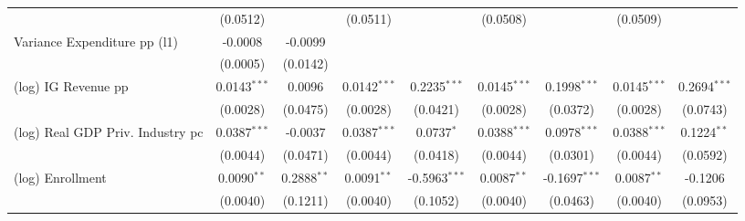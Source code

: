 \documentclass[
  10pt,
]{article}
\begin{document}
\begin{table}[htbp]
\begin{adjustbox}{max width=\linewidth}
\begin{tabular}{lcccccccc}
                                                        & (0.0512)            &                         & (0.0511)            &                                 & (0.0508)            &                                 & (0.0509)            &   \\   
         Variance Expenditure pp (l1)                   & -0.0008             & -0.0099                 &                     &                                 &                     &                                 &                     &   \\   
                                                        & (0.0005)            & (0.0142)                &                     &                                 &                     &                                 &                     &   \\   
         (log) IG Revenue pp                            & 0.0143$^{***}$      & 0.0096                  & 0.0142$^{***}$      & 0.2235$^{***}$                  & 0.0145$^{***}$      & 0.1998$^{***}$                  & 0.0145$^{***}$      & 0.2694$^{***}$\\   
                                                        & (0.0028)            & (0.0475)                & (0.0028)            & (0.0421)                        & (0.0028)            & (0.0372)                        & (0.0028)            & (0.0743)\\   
         (log) Real GDP Priv. Industry pc               & 0.0387$^{***}$      & -0.0037                 & 0.0387$^{***}$      & 0.0737$^{*}$                    & 0.0388$^{***}$      & 0.0978$^{***}$                  & 0.0388$^{***}$      & 0.1224$^{**}$\\   
                                                        & (0.0044)            & (0.0471)                & (0.0044)            & (0.0418)                        & (0.0044)            & (0.0301)                        & (0.0044)            & (0.0592)\\   
         (log) Enrollment                               & 0.0090$^{**}$       & 0.2888$^{**}$           & 0.0091$^{**}$       & -0.5963$^{***}$                 & 0.0087$^{**}$       & -0.1697$^{***}$                 & 0.0087$^{**}$       & -0.1206\\   
                                                        & (0.0040)            & (0.1211)                & (0.0040)            & (0.1052)                        & (0.0040)            & (0.0463)                        & (0.0040)            & (0.0953)\\   

\end{tabular}
\end{adjustbox}
\end{table}
\end{document}
